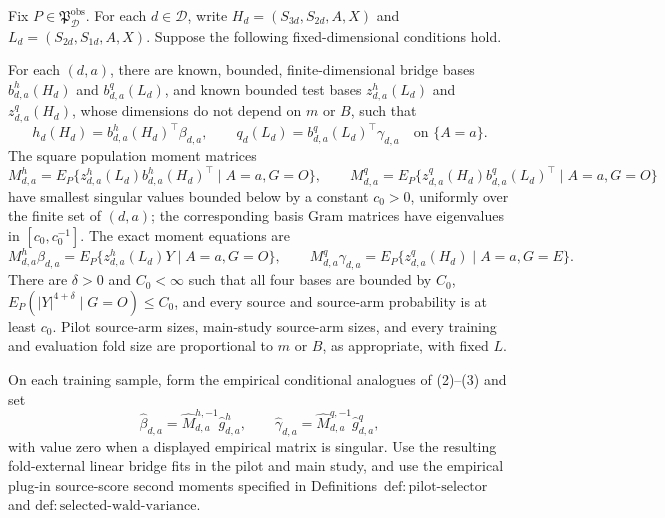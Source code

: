 Fix \(P\in\mathfrak P_{\mathcal D}^{\mathrm{obs}}\).  For each \(d\in\mathcal D\), write \(H_d=(S_{3d},S_{2d},A,X)\) and \(L_d=(S_{2d},S_{1d},A,X)\).  Suppose the following fixed-dimensional conditions hold.

For each \((d,a)\), there are known, bounded, finite-dimensional bridge bases \(b^h_{d,a}(H_d)\) and \(b^q_{d,a}(L_d)\), and known bounded test bases \(z^h_{d,a}(L_d)\) and \(z^q_{d,a}(H_d)\), whose dimensions do not depend on \(m\) or \(B\), such that
\[
 h_d(H_d)=b^h_{d,a}(H_d)^\top\beta_{d,a},
 \qquad
 q_d(L_d)=b^q_{d,a}(L_d)^\top\gamma_{d,a}
 \quad\text{on }\{A=a\}.                                    \tag{1}
\]
The square population moment matrices
\[
 M^h_{d,a}=E_P\{z^h_{d,a}(L_d)b^h_{d,a}(H_d)^\top\mid A=a,G=O\},
\qquad
 M^q_{d,a}=E_P\{z^q_{d,a}(H_d)b^q_{d,a}(L_d)^\top\mid A=a,G=O\} \tag{2}
\]
have smallest singular values bounded below by a constant \(c_0>0\), uniformly over the finite set of \((d,a)\); the corresponding basis Gram matrices have eigenvalues in \([c_0,c_0^{-1}]\).  The exact moment equations are
\[
 M^h_{d,a}\beta_{d,a}
 =E_P\{z^h_{d,a}(L_d)Y\mid A=a,G=O\},
 \qquad
 M^q_{d,a}\gamma_{d,a}
 =E_P\{z^q_{d,a}(H_d)\mid A=a,G=E\}.                         \tag{3}
\]
There are \(\delta>0\) and \(C_0<\infty\) such that all four bases are bounded by \(C_0\), \(E_P(|Y|^{4+\delta}\mid G=O)\le C_0\), and every source and source-arm probability is at least \(c_0\).  Pilot source-arm sizes, main-study source-arm sizes, and every training and evaluation fold size are proportional to \(m\) or \(B\), as appropriate, with fixed \(L\).

On each training sample, form the empirical conditional analogues of (2)--(3) and set
\[
 \widehat\beta_{d,a}=\widehat M_{d,a}^{h,-1}\widehat g^h_{d,a},
 \qquad
 \widehat\gamma_{d,a}=\widehat M_{d,a}^{q,-1}\widehat g^q_{d,a}, \tag{4}
\]
with value zero when a displayed empirical matrix is singular.  Use the resulting fold-external linear bridge fits in the pilot and main study, and use the empirical plug-in source-score second moments specified in Definitions~\(\mathrm{def{:}pilot\text{-}selector}\) and \(\mathrm{def{:}selected\text{-}wald\text{-}variance}\).

